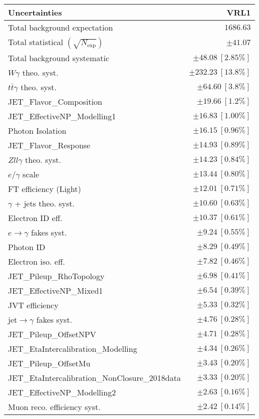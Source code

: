 \begin{tabular}{lr}
\hline
\textbf{Uncertainties} & \textbf{VRL1} \\
\hline
Total background expectation & $1686.63$ \\
\hline
Total statistical $(\sqrt{N_\mathrm{exp}})$ & $\pm 41.07$ \\
Total background systematic & $\pm 48.08\ [2.85\%]$ \\
\hline
\hline
$W\gamma$ theo. syst. & $\pm 232.23\ [13.8\%]$ \\
$t\bar{t}\gamma$ theo. syst. & $\pm 64.60\ [3.8\%]$ \\
JET\_Flavor\_Composition & $\pm 19.66\ [1.2\%]$ \\
JET\_EffectiveNP\_Modelling1 & $\pm 16.83\ [1.00\%]$ \\
Photon Isolation & $\pm 16.15\ [0.96\%]$ \\
JET\_Flavor\_Response & $\pm 14.93\ [0.89\%]$ \\
$Zll\gamma$ theo. syst. & $\pm 14.23\ [0.84\%]$ \\
$e/\gamma$ scale & $\pm 13.44\ [0.80\%]$ \\
FT efficiency (Light) & $\pm 12.01\ [0.71\%]$ \\
$\gamma$ + jets theo. syst. & $\pm 10.60\ [0.63\%]$ \\
Electron ID eff. & $\pm 10.37\ [0.61\%]$ \\
$e\to\gamma$ fakes syst. & $\pm 9.24\ [0.55\%]$ \\
Photon ID & $\pm 8.29\ [0.49\%]$ \\
Electron iso. eff. & $\pm 7.82\ [0.46\%]$ \\
JET\_Pileup\_RhoTopology & $\pm 6.98\ [0.41\%]$ \\
JET\_EffectiveNP\_Mixed1 & $\pm 6.54\ [0.39\%]$ \\
JVT efficiency & $\pm 5.33\ [0.32\%]$ \\
jet$\to\gamma$ fakes syst. & $\pm 4.76\ [0.28\%]$ \\
JET\_Pileup\_OffsetNPV & $\pm 4.71\ [0.28\%]$ \\
JET\_EtaIntercalibration\_Modelling & $\pm 4.34\ [0.26\%]$ \\
JET\_Pileup\_OffsetMu & $\pm 3.43\ [0.20\%]$ \\
JET\_EtaIntercalibration\_NonClosure\_2018data & $\pm 3.33\ [0.20\%]$ \\
JET\_EffectiveNP\_Modelling2 & $\pm 2.63\ [0.16\%]$ \\
Muon reco. efficiency syst. & $\pm 2.42\ [0.14\%]$ \\

\end{tabular}
